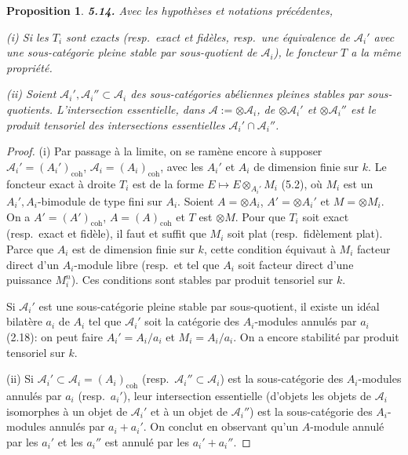 \documentclass[12pt,a4paper]{article}
\theoremstyle{plain}
\newtheorem{proposition}[theorem]{Proposition}
\theoremstyle{definition}
\theoremstyle{remark}
\begin{document}
\begin{proposition}\label{prop:5.14}
\textbf{5.14.} Avec les hypothèses et notations précédentes,

(i) Si les $T_i$ sont exacts (resp.~exact et fidèles, resp.~une équivalence de $\mathcal{A}_i'$ avec une sous-catégorie pleine stable par sous-quotient de $\mathcal{A}_i$), le foncteur $T$ a la même propriété.

(ii) Soient $\mathcal{A}_i', \mathcal{A}_i'' \subset \mathcal{A}_i$ des sous-catégories abéliennes pleines stables par sous-quotients. L'intersection essentielle, dans $\mathcal{A} := \otimes \mathcal{A}_i$, de $\otimes \mathcal{A}_i'$ et $\otimes \mathcal{A}_i''$ est le produit tensoriel des intersections essentielles $\mathcal{A}_i' \cap \mathcal{A}_i''$.
\end{proposition}

\begin{proof}
(i) Par passage à la limite, on se ramène encore à supposer $\mathcal{A}_i' = (A_i')_\mathrm{coh}$, $\mathcal{A}_i = (A_i)_\mathrm{coh}$, avec les $A_i'$ et $A_i$ de dimension finie sur $k$. Le foncteur exact à droite $T_i$ est de la forme $E \mapsto E \otimes_{A_i'} M_i$ (5.2), où $M_i$ est un $A_i', A_i$-bimodule de type fini sur $A_i$. Soient $A = \otimes A_i$, $A' = \otimes A_i'$ et $M = \otimes M_i$. On a $A' = (A')_\mathrm{coh}$, $A = (A)_\mathrm{coh}$ et $T$ est $\otimes M$. Pour que $T_i$ soit exact (resp.~exact et fidèle), il faut et suffit que $M_i$ soit plat (resp.~fidèlement plat). Parce que $A_i$ est de dimension finie sur $k$, cette condition équivaut à $M_i$ facteur direct d'un $A_i$-module libre (resp.~et tel que $A_i$ soit facteur direct d'une puissance $M_i^n$). Ces conditions sont stables par produit tensoriel sur $k$.

Si $\mathcal{A}_i'$ est une sous-catégorie pleine stable par sous-quotient, il existe un idéal bilatère $a_i$ de $A_i$ tel que $\mathcal{A}_i'$ soit la catégorie des $A_i$-modules annulés par $a_i$ (2.18): on peut faire $A_i' = A_i/a_i$ et $M_i = A_i/a_i$. On a encore stabilité par produit tensoriel sur $k$.

(ii) Si $\mathcal{A}_i' \subset \mathcal{A}_i = (A_i)_\mathrm{coh}$ (resp.~$\mathcal{A}_i'' \subset \mathcal{A}_i$) est la sous-catégorie des $A_i$-modules annulés par $a_i$ (resp.~$a_i'$), leur intersection essentielle (d'objets les objets de $\mathcal{A}_i$ isomorphes à un objet de $\mathcal{A}_i'$ et à un objet de $\mathcal{A}_i''$) est la sous-catégorie des $A_i$-modules annulés par $a_i + a_i'$. On conclut en observant qu'un $A$-module annulé par les $a_i'$ et les $a_i''$ est annulé par les $a_i' + a_i''$.
\end{proof}
\end{document}
